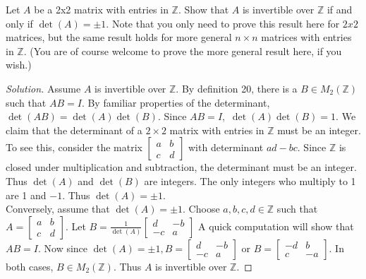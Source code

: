\documentclass[12pt]{article}
\newcommand{\Z}{\mathbb{Z}}
\let\ds\displaystyle
\newenvironment{exercise}[2][Exercise]{\begin{trivlist}
        \item[\hskip \labelsep {\bfseries #1}\hskip \labelsep {\bfseries #2.}]}{\end{trivlist}}
\newenvironment{solution}
        {\begin{proof}[Solution]}
                    {\end{proof}}
\begin{document}
\begin{exercise}{34}
    Let \( A \) be a 2x2 matrix with entries in \( \Z. \) Show that \( A \) is invertible over \( \Z \) if and only if \( \det(A) = \pm 1. \) Note that you only need to prove this result here for \( 2x2 \) matrices, but the same result holds for more general \( n \times n \) matrices with entries in \( \Z. \) (You are of course welcome to prove the more general result here, if you wish.)
    \begin{solution}
        Assume \( A \) is invertible over \( \Z. \) By definition 20, there is a \( B \in M_{2}(\Z) \) such that \( AB = I. \) By familiar properties of the determinant, \( \det(AB) = \det(A) \det(B) . \) Since \( AB = I, \) \( \det(A) \det(B) = 1. \) We claim that the determinant of a \( 2 \times 2 \) matrix with entries in \( \Z \) must be an integer. To see this, consider the matrix \( \begin{bmatrix}
            a & b\\
            c & d
        \end{bmatrix} \) with determinant \( ad - bc. \) Since \( \Z \) is closed under multiplication and subtraction, the determinant must be an integer. Thus \( \det(A) \) and \( \det(B) \) are integers. The only integers who multiply to 1 are 1 and \( -1. \) Thus \( \det(A) = \pm 1. \)\\
        Conversely, assume that \( \det(A) = \pm 1. \) Choose \( a,b,c,d \in \Z \) such that \( A = \begin{bmatrix}
            a & b\\
            c & d
        \end{bmatrix} .\) Let \( B =
            \ds\frac{1}{\det(A)} \begin{bmatrix}
                d & -b\\
                -c & a
            \end{bmatrix}\) A quick computation will show that \( AB = I. \) Now since \( \det(A) = \pm 1 , B = \begin{bmatrix}
                d & -b\\
                -c & a
            \end{bmatrix}\) or \( B = \begin{bmatrix}
                -d & b\\
                c & -a
            \end{bmatrix} .\) In both cases, \( B \in M_{2}(\Z) . \) Thus \( A \) is invertible over \( \Z. \)
    \end{solution}
\end{exercise}
\end{document}
